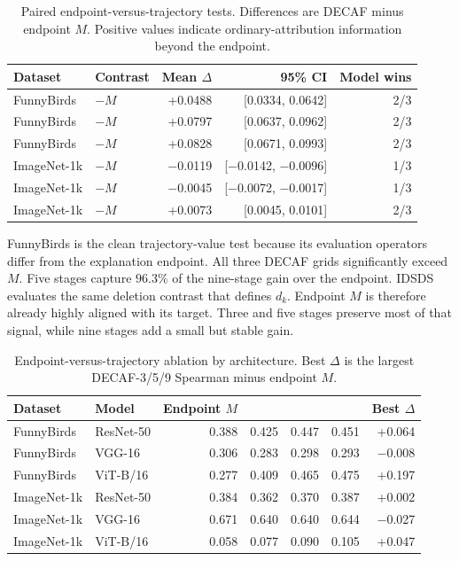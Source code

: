 \begin{table}[t]
\centering
\caption{Paired endpoint-versus-trajectory tests. Differences are DECAF minus endpoint $M$. Positive values indicate ordinary-attribution information beyond the endpoint.}
\label{tab:endpoint-trajectory-paired}
\footnotesize
\setlength{\tabcolsep}{4pt}
\begin{tabular}{llrrr}
\toprule
Dataset & Contrast & Mean $\Delta$ & 95\% CI & Model wins \\
\midrule
FunnyBirds & \decaf-3 $-M$ & +0.0488 & [0.0334, 0.0642] & 2/3 \\
FunnyBirds & \decaf-5 $-M$ & +0.0797 & [0.0637, 0.0962] & 2/3 \\
FunnyBirds & \decaf-9 $-M$ & +0.0828 & [0.0671, 0.0993] & 2/3 \\
\addlinespace
ImageNet-1k & \decaf-3 $-M$ & $-$0.0119 & [$-$0.0142, $-$0.0096] & 1/3 \\
ImageNet-1k & \decaf-5 $-M$ & $-$0.0045 & [$-$0.0072, $-$0.0017] & 1/3 \\
ImageNet-1k & \decaf-9 $-M$ & +0.0073 & [0.0045, 0.0101] & 2/3 \\
\bottomrule
\end{tabular}
\end{table}

FunnyBirds is the clean trajectory-value test because its evaluation operators differ from the explanation endpoint. All three DECAF grids significantly exceed $M$. Five stages capture $96.3\%$ of the nine-stage gain over the endpoint. IDSDS evaluates the same deletion contrast that defines $d_k$. Endpoint $M$ is therefore already highly aligned with its target. Three and five stages preserve most of that signal, while nine stages add a small but stable gain.

\begin{table}[t]
\centering
\caption{Endpoint-versus-trajectory ablation by architecture. Best $\Delta$ is the largest DECAF-3/5/9 Spearman minus endpoint $M$.}
\label{tab:endpoint-trajectory-per-model}
\footnotesize
\setlength{\tabcolsep}{4.2pt}
\begin{tabular}{llrrrrr}
\toprule
Dataset & Model & Endpoint $M$ & \decaf-3 & \decaf-5 & \decaf-9 & Best $\Delta$ \\
\midrule
FunnyBirds & ResNet-50 & 0.388 & 0.425 & 0.447 & 0.451 & +0.064 \\
FunnyBirds & VGG-16 & 0.306 & 0.283 & 0.298 & 0.293 & $-$0.008 \\
FunnyBirds & ViT-B/16 & 0.277 & 0.409 & 0.465 & 0.475 & +0.197 \\
ImageNet-1k & ResNet-50 & 0.384 & 0.362 & 0.370 & 0.387 & +0.002 \\
ImageNet-1k & VGG-16 & 0.671 & 0.640 & 0.640 & 0.644 & $-$0.027 \\
ImageNet-1k & ViT-B/16 & 0.058 & 0.077 & 0.090 & 0.105 & +0.047 \\
\bottomrule
\end{tabular}
\end{table}

